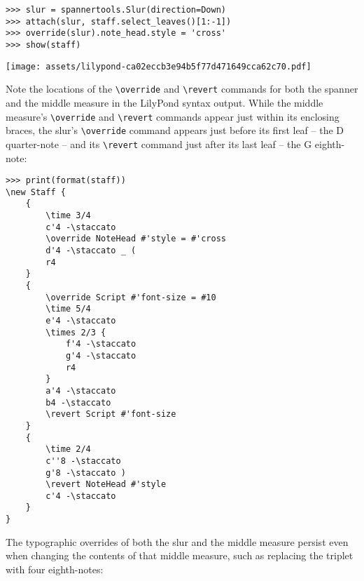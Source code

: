 \begin{abjadbookoutput}
\begin{singlespacing}
\vspace{-0.5\baselineskip}
\begin{verbatim}
>>> slur = spannertools.Slur(direction=Down)
>>> attach(slur, staff.select_leaves()[1:-1])
>>> override(slur).note_head.style = 'cross'
>>> show(staff)
\end{verbatim}
\noindent\texttt{[image: assets/lilypond-ca02eccb3e94b5f77d471649cca62c70.pdf]}
\end{singlespacing}
\end{abjadbookoutput}

\noindent Note the locations of the \texttt{\textbackslash{}override} and
\texttt{\textbackslash{}revert} commands for both the spanner and the middle
measure in the LilyPond syntax output. While the middle measure's
\texttt{\textbackslash{}override} and \texttt{\textbackslash{}revert} commands
appear just within its enclosing braces, the slur's
\texttt{\textbackslash{}override} command appears just before its first leaf --
the D quarter-note -- and its \texttt{\textbackslash{}revert} command just
after its last leaf -- the G eighth-note:

\begin{comment}
<abjad>
print(format(staff))
</abjad>
\end{comment}

\begin{abjadbookoutput}
\begin{singlespacing}
\vspace{-0.5\baselineskip}
\begin{verbatim}
>>> print(format(staff))
\new Staff {
    {
        \time 3/4
        c'4 -\staccato
        \override NoteHead #'style = #'cross
        d'4 -\staccato _ (
        r4
    }
    {
        \override Script #'font-size = #10
        \time 5/4
        e'4 -\staccato
        \times 2/3 {
            f'4 -\staccato
            g'4 -\staccato
            r4
        }
        a'4 -\staccato
        b4 -\staccato
        \revert Script #'font-size
    }
    {
        \time 2/4
        c''8 -\staccato
        g'8 -\staccato )
        \revert NoteHead #'style
        c'4 -\staccato
    }
}
\end{verbatim}
\end{singlespacing}
\end{abjadbookoutput}

\noindent The typographic overrides of both the slur and the middle measure
persist even when changing the contents of that middle measure, such as
replacing the triplet with four eighth-notes:

